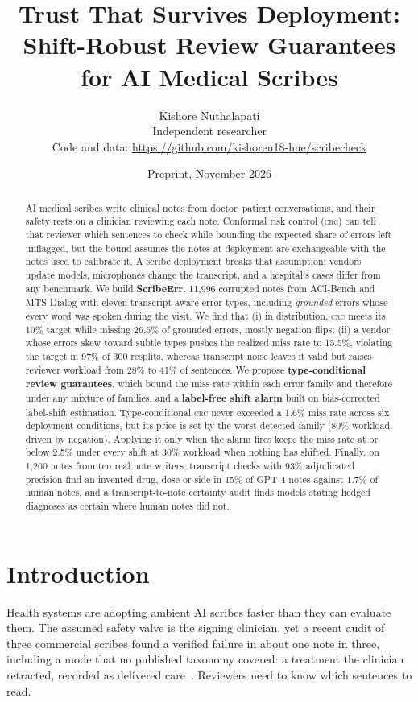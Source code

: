 \documentclass[10pt,twocolumn]{article}
\title{\vspace{-0.6in}\bf Trust That Survives Deployment:\\Shift-Robust Review Guarantees for AI Medical Scribes}
\author{Kishore Nuthalapati\\{\small Independent researcher}\\{\small Code and data: \url{https://github.com/kishoren18-hue/scribecheck}}}
\date{\small Preprint, November 2026}
\newcommand{\crc}{\textsc{crc}}
\begin{document}
\maketitle

\begin{abstract}
AI medical scribes write clinical notes from doctor--patient conversations, and their safety rests on a clinician reviewing each note. Conformal risk control (\crc) can tell that reviewer which sentences to check while bounding the expected share of errors left unflagged, but the bound assumes the notes at deployment are exchangeable with the notes used to calibrate it. A scribe deployment breaks that assumption: vendors update models, microphones change the transcript, and a hospital's cases differ from any benchmark. We build \textbf{ScribeErr}, 11,996 corrupted notes from ACI-Bench and MTS-Dialog with eleven transcript-aware error types, including \emph{grounded} errors whose every word was spoken during the visit. We find that (i) in distribution, \crc{} meets its 10\% target while missing 26.5\% of grounded errors, mostly negation flips; (ii) a vendor whose errors skew toward subtle types pushes the realized miss rate to 15.5\%, violating the target in 97\% of 300 resplits, whereas transcript noise leaves it valid but raises reviewer workload from 28\% to 41\% of sentences. We propose \textbf{type-conditional review guarantees}, which bound the miss rate within each error family and therefore under any mixture of families, and a \textbf{label-free shift alarm} built on bias-corrected label-shift estimation. Type-conditional \crc{} never exceeded a 1.6\% miss rate across six deployment conditions, but its price is set by the worst-detected family (80\% workload, driven by negation). Applying it only when the alarm fires keeps the miss rate at or below 2.5\% under every shift at 30\% workload when nothing has shifted. Finally, on 1,200 notes from ten real note writers, transcript checks with 93\% adjudicated precision find an invented drug, dose or side in 15\% of GPT-4 notes against 1.7\% of human notes, and a transcript-to-note certainty audit finds models stating hedged diagnoses as certain where human notes did not.
\end{abstract}

\section{Introduction}
Health systems are adopting ambient AI scribes faster than they can evaluate them. The assumed safety valve is the signing clinician, yet a recent audit of three commercial scribes found a verified failure in about one note in three, including a mode that no published taxonomy covered: a treatment the clinician retracted, recorded as delivered care~\citep{fox2026census}. Reviewers need to know which sentences to read.
\end{document}

